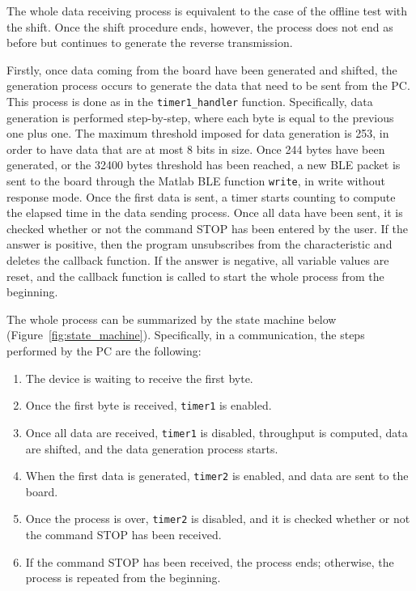 \documentclass{Configuration_Files/PoliMi3i_thesis}
\begin{document}
The whole data receiving process is equivalent to the case of the offline test with the shift. Once the shift procedure ends, however, the process does not end as before but continues to generate the reverse transmission.

Firstly, once data coming from the board have been generated and shifted, the generation process occurs to generate the data that need to be sent from the PC. This process is done as in the \texttt{timer1\_handler} function. Specifically, data generation is performed step-by-step, where each byte is equal to the previous one plus one. The maximum threshold imposed for data generation is 253, in order to have data that are at most 8 bits in size. Once 244 bytes have been generated, or the 32400 bytes threshold has been reached, a new BLE packet is sent to the board through the Matlab BLE function \texttt{write}, in write without response mode. Once the first data is sent, a timer starts counting to compute the elapsed time in the data sending process. Once all data have been sent, it is checked whether or not the command STOP has been entered by the user. If the answer is positive, then the program unsubscribes from the characteristic and deletes the callback function. If the answer is negative, all variable values are reset, and the callback function is called to start the whole process from the beginning.

The whole process can be summarized by the state machine below (Figure~\ref{fig:state_machine}). Specifically, in a communication, the steps performed by the PC are the following:

\begin{enumerate}
    \item The device is waiting to receive the first byte.
    \item Once the first byte is received, \texttt{timer1} is enabled.
    \item Once all data are received, \texttt{timer1} is disabled, throughput is computed, data are shifted, and the data generation process starts.
    \item When the first data is generated, \texttt{timer2} is enabled, and data are sent to the board.
    \item Once the process is over, \texttt{timer2} is disabled, and it is checked whether or not the command STOP has been received.
    \item If the command STOP has been received, the process ends; otherwise, the process is repeated from the beginning.
\end{enumerate}
\end{document}
